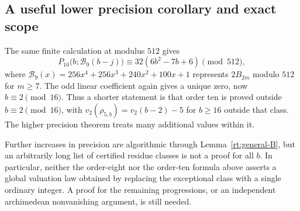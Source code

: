 \subsection{A useful lower precision corollary and exact scope}

The same finite calculation at modulus $512$ gives
\[
 P_{10}\bigl(b;\mathcal B_9(b-j)\bigr)
 \equiv32(6b^2-7b+6)\pmod{512},
\]
where
$\mathcal B_9(x)=256x^4+256x^3+240x^2+100x+1$
represents $2B_{2m}$ modulo $512$ for $m\ge7$. The odd linear
coefficient again gives a unique zero, now $b\equiv2\pmod{16}$.
Thus a shorter statement is that order ten is proved outside
$b\equiv2\pmod{16}$, with
$v_2(\rho_{5,b})=v_2(b-2)-5$ for $b\ge16$ outside that class.
The higher precision theorem treats many additional values within it.

Further increases in precision are algorithmic through
Lemma~\ref{rt:general-B}, but an arbitrarily long list of certified
residue classes is not a proof for all $b$. In particular, neither
the order-eight nor the order-ten formula above asserts a global
valuation law obtained by replacing the exceptional class with a
single ordinary integer. A proof for the remaining progressions,
or an independent archimedean nonvanishing argument, is still needed.
